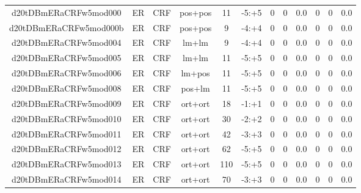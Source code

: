 \documentclass[a4paper]{article}
\begin{document}
\begin{landscape}
\begin{center}
\begin{tabular}{ |c|c|c|c|c|c|c|c|c|c|c|c|}
 
 	
 	\small{ d20tDBmERaCRFw5mod000 } & ER & CRF & pos+pos  &  11 &  -5:+5  &  0 & 0 & 0.0  &  0 & 0 & 0.0 \\
 	

 
 	
 	\small{ d20tDBmERaCRFw5mod000b } & ER & CRF & pos+pos  &  9 &  -4:+4  &  0 & 0 & 0.0  &  0 & 0 & 0.0 \\
 	

 
 	
 	\small{ d20tDBmERaCRFw5mod004 } & ER & CRF & lm+lm  &  9 &  -4:+4  &  0 & 0 & 0.0  &  0 & 0 & 0.0 \\
 	

 
 	
 	\small{ d20tDBmERaCRFw5mod005 } & ER & CRF & lm+lm  &  11 &  -5:+5  &  0 & 0 & 0.0  &  0 & 0 & 0.0 \\
 	

 
 	
 	\small{ d20tDBmERaCRFw5mod006 } & ER & CRF & lm+pos  &  11 &  -5:+5  &  0 & 0 & 0.0  &  0 & 0 & 0.0 \\
 	

 
 	
 	\small{ d20tDBmERaCRFw5mod008 } & ER & CRF & pos+lm  &  11 &  -5:+5  &  0 & 0 & 0.0  &  0 & 0 & 0.0 \\
 	

 
 	
 	\small{ d20tDBmERaCRFw5mod009 } & ER & CRF & ort+ort  &  18 &  -1:+1  &  0 & 0 & 0.0  &  0 & 0 & 0.0 \\
 	

 
 	
 	\small{ d20tDBmERaCRFw5mod010 } & ER & CRF & ort+ort  &  30 &  -2:+2  &  0 & 0 & 0.0  &  0 & 0 & 0.0 \\
 	

 
 	
 	\small{ d20tDBmERaCRFw5mod011 } & ER & CRF & ort+ort  &  42 &  -3:+3  &  0 & 0 & 0.0  &  0 & 0 & 0.0 \\
 	

 
 	
 	\small{ d20tDBmERaCRFw5mod012 } & ER & CRF & ort+ort  &  62 &  -5:+5  &  0 & 0 & 0.0  &  0 & 0 & 0.0 \\
 	

 
 	
 	\small{ d20tDBmERaCRFw5mod013 } & ER & CRF & ort+ort  &  110 &  -5:+5  &  0 & 0 & 0.0  &  0 & 0 & 0.0 \\
 	

 
 	
 	\small{ d20tDBmERaCRFw5mod014 } & ER & CRF & ort+ort  &  70 &  -3:+3  &  0 & 0 & 0.0  &  0 & 0 & 0.0 \\
 	


\end{tabular}
\end{center}
\end{landscape}
\end{document}
